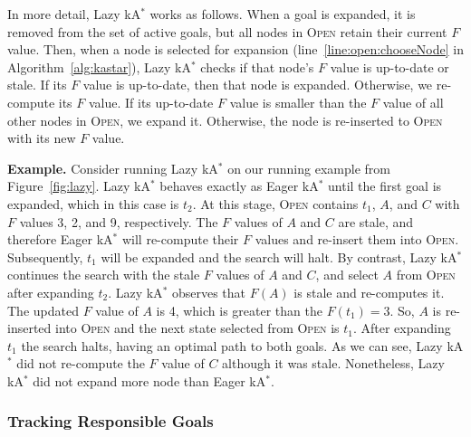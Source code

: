 \documentclass[smallextended]{svjour3}       %
\newcommand{\kastar}{kA$^*$\xspace}
\newcommand{\open}{\textsc{Open}\xspace}
\begin{document}
In more detail, Lazy \kastar works as follows. 
When a goal is expanded, it is removed from the set of active goals, but all nodes in \open retain their current $F$ value. Then, when a node is selected for expansion (line~\ref{line:open:chooseNode} in Algorithm~\ref{alg:kastar}), Lazy \kastar checks if that node's $F$ value is up-to-date or stale. 
If its $F$ value is up-to-date, then that node is expanded. 
Otherwise, we re-compute its $F$ value. If its up-to-date $F$ value is smaller than the $F$ value of all other nodes in \open, we expand it. Otherwise, the node is re-inserted to \open with its new $F$ value. 








\noindent \textbf{Example.} 
Consider running Lazy \kastar on our running example from Figure~\ref{fig:lazy}. 
Lazy \kastar behaves exactly as Eager \kastar until the first goal is expanded, which in this case is $t_2$.
At this stage, \open contains $t_1$, $A$, and $C$ with $F$ values 3, 2, and 9, respectively.
The $F$ values of $A$ and $C$ are stale, and therefore Eager \kastar will re-compute their $F$ values and re-insert them into \open. Subsequently, $t_1$ will be expanded and the search will halt. 
By contrast, Lazy \kastar continues the search with the stale $F$ values of $A$ and $C$, and select $A$ from \open after expanding $t_2$. 
Lazy \kastar observes that $F(A)$ is stale and re-computes it. 
The updated $F$ value of $A$ is 4, which is greater than the $F(t_1)=3$.
So, $A$ is re-inserted into \open and the next state selected from \open is $t_1$.
After expanding $t_1$ the search halts, having an optimal path to both goals.
As we can see, Lazy \kastar did not re-compute the $F$ value of $C$ although it was stale. Nonetheless, Lazy \kastar did not expand more node than Eager \kastar. 


\subsubsection{Tracking Responsible Goals} %
\end{document}
